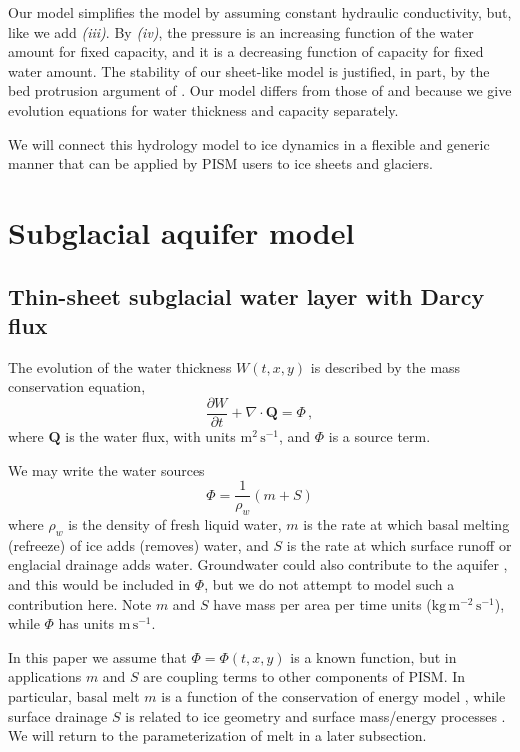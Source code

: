 \documentclass[11pt]{amsart}
\newcommand{\bQ}{\mathbf{Q}}
\begin{document}
Our model simplifies the \citet{FlowersClarke2002_theory} model by assuming constant hydraulic conductivity, but, like \citet{Hewitt2011} we add \emph{(iii)}.  By \emph{(iv)}, the pressure is an increasing function of the water amount for fixed capacity, and it is a decreasing function of capacity for fixed water amount.  The stability of our sheet-like model is justified, in part, by the bed protrusion argument of \citet{CreytsSchoof2009}.  Our model differs from those of \citet{CreytsSchoof2009} and \citet{Hewitt2011} because we give evolution equations for water thickness and capacity separately.

We will connect this hydrology model to ice dynamics in a flexible and generic manner that can be applied by PISM users to ice sheets and glaciers.


\section{Subglacial aquifer model}

\subsection*{Thin-sheet subglacial water layer with Darcy flux}
The evolution of the water thickness $W(t,x,y)$ is described by the mass conservation equation,
\begin{equation} \label{eq:conserve}
\frac{\partial W}{\partial t} + \nabla \cdot \bQ = \Phi \, ,
\end{equation}
where $\bQ$ is the water flux, with units $\text{m}^2\,\text{s}^{-1}$, and $\Phi$ is a source term.

We may write the water sources
\begin{equation} \label{eq:watersources}
  \Phi = \frac{1}{\rho_w} \left(m + S\right)
\end{equation}
where $\rho_w$ is the density of fresh liquid water, $m$ is the rate at which basal melting (refreeze) of ice adds (removes) water, and $S$ is the rate at which surface runoff or englacial drainage adds water.  Groundwater could also contribute to the aquifer \citep[e.g.][]{DeFooretal2011}, and this would be included in $\Phi$, but we do not attempt to model such a contribution here.  Note $m$ and $S$ have mass per area per time units ($\text{kg}\,\text{m}^{-2}\,\text{s}^{-1}$), while $\Phi$ has units $\text{m}\,\text{s}^{-1}$.

In this paper we assume that $\Phi=\Phi(t,x,y)$ is a known function, but in applications $m$ and $S$ are coupling terms to other components of PISM.  In particular, basal melt $m$ is a function of the conservation of energy model \citep{AschwandenBuelerKhroulevBlatter}, while surface drainage $S$ is related to ice geometry and surface mass/energy processes \citep[e.g.][]{vanPeltetal}.  We will return to the parameterization of melt in a later subsection.
\end{document}
